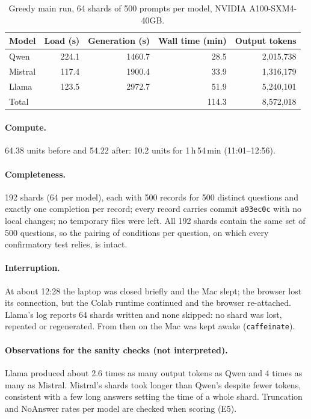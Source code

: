 \documentclass[11pt,a4paper]{report}
\begin{document}
\begin{table}[h]
\centering
\begin{tabular}{lrrrr}
\hline
Model & Load (s) & Generation (s) & Wall time (min) & Output tokens \\
\hline
Qwen    & 224.1 & 1460.7 & 28.5 & 2{,}015{,}738 \\
Mistral & 117.4 & 1900.4 & 33.9 & 1{,}316{,}179 \\
Llama   & 123.5 & 2972.7 & 51.9 & 5{,}240{,}101 \\
\hline
Total   &       &        & 114.3 & 8{,}572{,}018 \\
\hline
\end{tabular}
\caption{Greedy main run, 64 shards of 500 prompts per model, NVIDIA A100-SXM4-40GB.}
\end{table}

\paragraph{Compute.} 64.38 units before and 54.22 after: 10.2 units for
1\,h\,54\,min (11:01--12:56).

\paragraph{Completeness.} 192 shards (64 per model), each with 500 records
for 500 distinct questions and exactly one completion per record; every
record carries commit \texttt{a93ec0c} with no local changes; no temporary
files were left. All 192 shards contain the same set of 500 questions, so
the pairing of conditions per question, on which every confirmatory test
relies, is intact.

\paragraph{Interruption.} At about 12:28 the laptop was closed briefly and the
Mac slept; the browser lost its connection, but the Colab runtime continued
and the browser re-attached. Llama's log reports 64 shards written and none
skipped: no shard was lost, repeated or regenerated. From then on the Mac
was kept awake (\texttt{caffeinate}).

\paragraph{Observations for the sanity checks (not interpreted).} Llama
produced about 2.6 times as many output tokens as Qwen and 4 times as many
as Mistral. Mistral's shards took longer than Qwen's despite fewer tokens,
consistent with a few long answers setting the time of a whole shard.
Truncation and NoAnswer rates per model are checked when scoring (E5).
\end{document}
